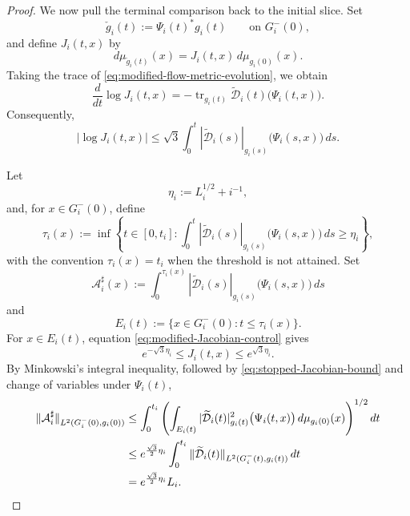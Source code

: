\documentclass[10pt,a4paper]{amsart}
\begin{document}
\begin{proof}
\noindent
We now pull the terminal comparison back to the initial slice. Set
\[
        \check g_i(t):=\Psi_i(t)^*g_i(t)
        \qquad\text{on }G_i^-(0),
\]
and define \(J_i(t,x)\) by
\[
        d\mu_{\check g_i(t)}(x)
        =
        J_i(t,x)\,d\mu_{g_i(0)}(x).
\]
Taking the trace of
\eqref{eq:modified-flow-metric-evolution}, we obtain
\[
        \frac{d}{dt}\log J_i(t,x)
        =
        -\operatorname{tr}_{g_i(t)}
        \widetilde{\mathcal D}_i(t)
        \bigl(\Psi_i(t,x)\bigr).
\]
Consequently,
\begin{equation}
\label{eq:modified-Jacobian-control}
        |\log J_i(t,x)|
        \leq
        \sqrt{3}
        \int_0^t
        |\widetilde{\mathcal D}_i(s)|_{g_i(s)}
        \bigl(\Psi_i(s,x)\bigr)\,ds .
\end{equation}

\noindent
Let
\[
        \eta_i:=L_i^{1/2}+i^{-1},
\]
and, for \(x\in G_i^-(0)\), define
\[
        \tau_i(x)
        :=
        \inf\left\{
        t\in[0,t_i]:
        \int_0^t
        |\widetilde{\mathcal D}_i(s)|_{g_i(s)}
        \bigl(\Psi_i(s,x)\bigr)\,ds
        \geq\eta_i
        \right\},
\]
with the convention \(\tau_i(x)=t_i\) when the threshold is not
attained. Set
\[
        \mathcal A_i^\sharp(x)
        :=
        \int_0^{\tau_i(x)}
        |\widetilde{\mathcal D}_i(s)|_{g_i(s)}
        \bigl(\Psi_i(s,x)\bigr)\,ds
\]
and
\[
        E_i(t):=
        \{x\in G_i^-(0):t\leq\tau_i(x)\}.
\]
For \(x\in E_i(t)\), equation
\eqref{eq:modified-Jacobian-control} gives
\begin{equation}
\label{eq:stopped-Jacobian-bound}
        e^{-\sqrt{3}\eta_i}
        \leq
        J_i(t,x)
        \leq
        e^{\sqrt{3}\eta_i}.
\end{equation}
By Minkowski's integral inequality, followed by
\eqref{eq:stopped-Jacobian-bound} and change of variables under
\(\Psi_i(t)\),
\begin{align}
        \|\mathcal A_i^\sharp\|
        _{L^2(G_i^-(0),g_i(0))}
        &\leq
        \int_0^{t_i}
        \left(
        \int_{E_i(t)}
        |\widetilde{\mathcal D}_i(t)|_{g_i(t)}^2
        \bigl(\Psi_i(t,x)\bigr)
        \,d\mu_{g_i(0)}(x)
        \right)^{1/2}dt
        \notag\\
        &\leq
        e^{\frac{\sqrt{3}}{2}\eta_i}
        \int_0^{t_i}
        \|\widetilde{\mathcal D}_i(t)\|
        _{L^2(G_i^-(t),g_i(t))}\,dt
        \notag\\
        &=
        e^{\frac{\sqrt{3}}{2}\eta_i}L_i .
\label{eq:stopped-accumulation-L2}
\end{align}


\end{proof}
\end{document}
